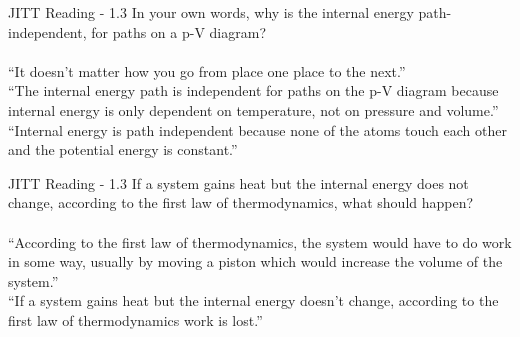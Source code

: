 \documentclass{beamer}
\begin{document}
\begin{frame}{JITT Reading -  1.3}
\small
In your own words, why is the internal energy path-independent, for paths on a p-V diagram? \\ \hrulefill \\
``It doesn’t matter how you go from place one place to the next.'' \\
``The internal energy path is independent for paths on the p-V diagram because internal energy is only dependent on temperature, not on pressure and volume.'' \\
``Internal energy is path independent because none of the atoms touch each other and the potential energy is constant.''
\end{frame}

\begin{frame}{JITT Reading -  1.3}
\small
If a system gains heat but the internal energy does not change, according to the first law of thermodynamics, what should happen? \\ \hrulefill \\
``According to the first law of thermodynamics, the system would have to do work in some way, usually by moving a piston which would increase the volume of the system.'' \\
``If a system gains heat but the internal energy doesn't change, according to the first law of thermodynamics work is lost.''
\end{frame}
\end{document}
